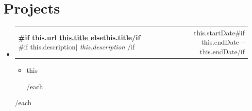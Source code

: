 \documentclass[letterpaper,11pt]{article}
\makeatletter
\newcommand{\resumeItem}[1]{
  \item\small{
    {#1 \vspace{-2pt}}
  }
}
\newcommand{\resumeProjectHeading}[2]{
    \item
    \begin{tabular*}{0.97\textwidth}{l@{\extracolsep{\fill}}r}
      \small#1 & #2 \\
    \end{tabular*}\vspace{-7pt}
}
\newcommand{\resumeSubHeadingListStart}{\begin{itemize}[leftmargin=0.15in, label={}]}
\newcommand{\resumeSubHeadingListEnd}{\end{itemize}}
\newcommand{\resumeItemListStart}{\begin{itemize}}
\newcommand{\resumeItemListEnd}{\end{itemize}\vspace{-5pt}}
\makeatother
\begin{document}
\section{Projects}
    \resumeSubHeadingListStart
    {{#each projects}}
      \resumeProjectHeading
        { \textbf{ {{#if this.url}} \href{ {{this.url}} }{ {{this.title}} } {{else}}{{this.title}}{{/if}} }{{#if this.description}}$|$\emph{ {{this.description}} } {{/if}} }{ {{this.startDate}}{{#if this.endDate}} -- {{this.endDate}}{{/if}} }
          \resumeItemListStart
            {{#each this.responsibilities}}
              \resumeItem{ {{this}} }
            {{/each}}
          \resumeItemListEnd
    {{/each}}
    \resumeSubHeadingListEnd
\end{document}

